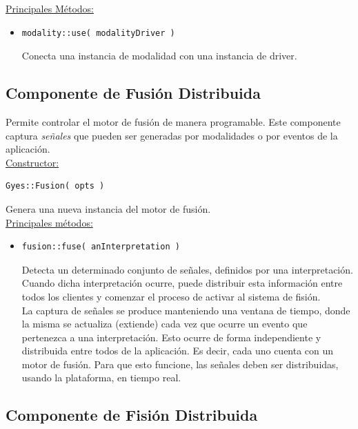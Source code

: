 \underline{\textsf{Principales Métodos:}}\\
\begin{itemize}
\item[]
\begin{lstlisting}
modality::use( modalityDriver )
\end{lstlisting}
Conecta una instancia de modalidad con una instancia de driver.
\end{itemize}

\subsection{Componente de Fusión Distribuida}

Permite controlar el motor de fusión de manera programable. Este componente captura \emph{señales} que pueden ser generadas por modalidades o por eventos de la aplicación.
\\

\underline{\textsf{Constructor:}}\\
\begin{lstlisting}
Gyes::Fusion( opts )
\end{lstlisting}
Genera una nueva instancia del motor de fusión. 
\\

\underline{\textsf{Principales métodos:}}\\
\begin{itemize}
\item[]
\begin{lstlisting}
fusion::fuse( anInterpretation )
\end{lstlisting}
Detecta un determinado conjunto de señales, definidos por una interpretación. Cuando dicha interpretación ocurre, puede distribuir esta información entre todos los clientes y comenzar el proceso de activar al sistema de fisión.
\\

La captura de señales se produce manteniendo una ventana de tiempo, donde la misma se actualiza (extiende) cada vez que ocurre un evento que pertenezca a una interpretación. Esto ocurre de forma independiente y distribuida entre todos de la aplicación. Es decir, cada uno cuenta con un motor de fusión. Para que esto funcione, las señales deben ser distribuidas, usando la plataforma, en tiempo real.
\end{itemize}

\subsection{Componente de Fisión Distribuida}


